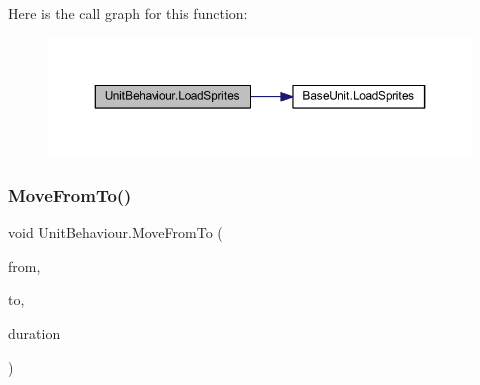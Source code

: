 Here is the call graph for this function\+:\nopagebreak
\begin{figure}[H]
\begin{center}
\leavevmode
\includegraphics[width=350pt]{class_unit_behaviour_a544570d55168594c1e4502dbe5c9d6a8_cgraph}
\end{center}
\end{figure}
\mbox{\label{class_unit_behaviour_a46ff5685dd97f930e6e2a835e01efb4d}} 
\subsubsection{\texorpdfstring{MoveFromTo()}{MoveFromTo()}}
{\footnotesize\ttfamily void Unit\+Behaviour.\+Move\+From\+To (\begin{DoxyParamCaption}\item[{Vector2\+Int}]{from,  }\item[{Vector2\+Int}]{to,  }\item[{float}]{duration }\end{DoxyParamCaption})}

